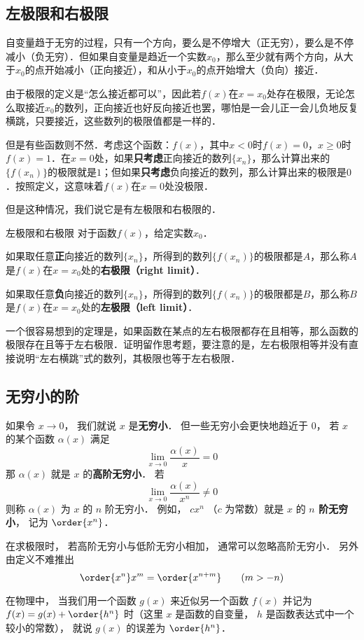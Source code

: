 \subsection{左极限和右极限}

自变量趋于无穷的过程，只有一个方向，要么是不停增大（正无穷），要么是不停减小（负无穷）．但如果自变量是趋近一个实数$x_0$，那么至少就有两个方向，从大于$x_0$的点开始减小（正向接近），和从小于$x_0$的点开始增大（负向）接近．

由于极限的定义是“怎么接近都可以”，因此若$f(x)$在$x=x_0$处存在极限，无论怎么取接近$x_0$的数列，正向接近也好反向接近也罢，哪怕是一会儿正一会儿负地反复横跳，只要接近，这些数列的极限值都是一样的．

但是有些函数则不然．考虑这个函数：$f(x)$，其中$x<0$时$f(x)=0$，$x\geq 0$时$f(x)=1$．在$x=0$处，如果\textbf{只考虑}正向接近的数列$\{x_n\}$，那么计算出来的$\{f(x_n)\}$的极限就是$1$；但如果\textbf{只考虑}负向接近的数列，那么计算出来的极限是$0$．按照定义，这意味着$f(x)$在$x=0$处没极限．

但是这种情况，我们说它是有左极限和右极限的．

\begin{definition}{左极限和右极限}
对于函数$f(x)$，给定实数$x_0$．

如果取任意\textbf{正}向接近的数列$\{x_n\}$，所得到的数列$\{f(x_n)\}$的极限都是$A$，那么称$A$是$f(x)$在$x=x_0$处的\textbf{右极限（right limit）}．

如果取任意\textbf{负}向接近的数列$\{x_n\}$，所得到的数列$\{f(x_n)\}$的极限都是$B$，那么称$B$是$f(x)$在$x=x_0$处的\textbf{左极限（left limit）}．
\end{definition}

一个很容易想到的定理是，如果函数在某点的左右极限都存在且相等，那么函数的极限存在且等于左右极限．证明留作思考题，要注意的是，左右极限相等并没有直接说明“左右横跳”式的数列，其极限也等于左右极限．





\subsection{无穷小的阶}
如果令 $x\to 0$， 我们就说 $x$ 是\textbf{无穷小}． 但一些无穷小会更快地趋近于 $0$， 若 $x$ 的某个函数 $\alpha(x)$ 满足
\begin{equation}
\lim_{x\to 0} \frac{\alpha(x)}{x} = 0
\end{equation}
那 $\alpha(x)$ 就是 $x$ 的\textbf{高阶无穷小}． 若
\begin{equation}
\lim_{x\to 0} \frac{\alpha(x)}{x^n} \ne 0
\end{equation}
则称 $\alpha(x)$ 为 $x$ 的 $n$ 阶无穷小． 例如， $c x^n$ （$c$ 为常数）就是 $x$ 的 \textbf{$n$ 阶无穷小}， 记为 $\order{x^n}$．

在求极限时， 若高阶无穷小与低阶无穷小相加， 通常可以忽略高阶无穷小． 另外由定义不难推出
\begin{equation}
\order{x^n} x^m = \order{x^{n + m}} \qquad (m > -n)
\end{equation}

在物理中， 当我们用一个函数 $g(x)$ 来近似另一个函数 $f(x)$ 并记为 $f(x) = g(x) + \order{h^n}$ 时（这里 $x$ 是函数的自变量， $h$ 是函数表达式中一个较小的常数）， 就说 $g(x)$ 的误差为 $\order{h^n}$．
